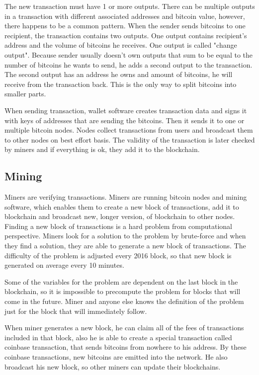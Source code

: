 \documentclass[
  digital, %
  table,   %
  lof,     %
  lot,     %
  oneside
]{fithesis3}
\begin{document}
The new transaction must have 1 or more outputs.
There can be multiple outputs in a transaction with different associated addresses and bitcoin value,
however, there happens to be a common pattern. When the sender sends bitcoins to one recipient,
the transaction contains two outputs.
One output contains recipient's address and the volume of bitcoins he receives.
One output is called "change output". Because sender usually doesn't own outputs that sum to be equal to the number of bitcoins he wants to send, he adds a second output to the transaction. The second output has an address he owns and amount of bitcoins, he will receive from the transaction back.
 This is the only way to split bitcoins into smaller parts. 

When sending transaction,
 wallet software creates transaction data and signs it with keys of addresses that are sending the bitcoins.
 Then it sends it to one or multiple bitcoin nodes.
Nodes collect transactions from users and broadcast them to other nodes on best effort basis.
The validity of the transaction is later checked by miners and if everything is ok, they add it to the blockchain.

\subsection{Mining}

Miners are verifying transactions.
Miners are running bitcoin nodes and mining software, which enables them to create a new block of transactions, add it to blockchain and broadcast new, longer version, of blockchain to other nodes.
Finding a new block of transactions is a hard problem from computational perspective.
Miners look for a solution to the problem by brute-force and when they find a solution, they are able to generate a new block of transactions. The difficulty of the problem is adjusted every 2016 block,
so that new block is generated on average every 10 minutes.

Some of the variables for the problem are dependent on the last block in the blockchain, so it is impossible
to precompute the problem for blocks that will come in the future. 
Miner and anyone else knows the definition of the problem just for the block that will immediately follow.

When miner generates a new block, he can claim all of the fees of transactions included in that block,
also he is able to create a special transaction called coinbase transaction, that sends bitcoins from nowhere to his address. By these coinbase transactions, new bitcoins are emitted into the network.
He also broadcast his new block, so other miners can update their blockchains. 
\end{document}
